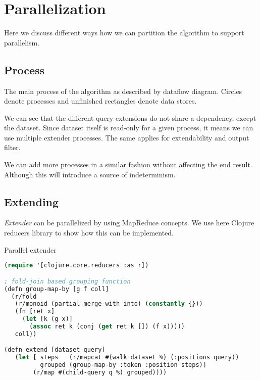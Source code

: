 \chapter{Parallelization}

Here we discuss different ways how we can partition the algorithm to support parallelism.

\section{Process}

The main process of the algorithm as described by dataflow diagram.\cite{Kahn74,Lee95} Circles denote processes and unfinished rectangles denote data stores.

\begin{figure}[H]
	
\end{figure}

We can see that the different query extensions do not share a dependency, except the dataset. Since dataset itself is read-only for a given process, it means we can use multiple extender processes. The same applies for extendability and output filter.

\begin{figure}[H]
	
\end{figure}

We can add more processes in a similar fashion without affecting the end result. Although this will introduce a source of indeterminism.

\section{Extending}

\emph{Extender} can be parallelized by using MapReduce\cite{MapReduce} concepts. We use here Clojure\cite{clojure} reducers library to show how this can be implemented.

\begin{algorithm}[H]
	\caption{Parallel extender}
\begin{lstlisting}[language=Lisp]
(require '[clojure.core.reducers :as r])

; fold-join based grouping function
(defn group-map-by [g f coll]
  (r/fold 
   (r/monoid (partial merge-with into) (constantly {}))
   (fn [ret x]
     (let [k (g x)]
       (assoc ret k (conj (get ret k []) (f x)))))
   coll))

(defn extend [dataset query]
   (let [ steps   (r/mapcat #(walk dataset %) (:positions query))
          grouped (group-map-by :token :position steps)]
        (r/map #(child-query q %) grouped))))
\end{lstlisting}
\end{algorithm}

